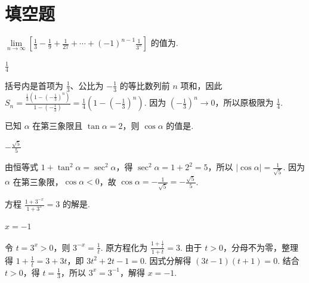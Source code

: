 \section{填空题}

\begin{problem}
\(\displaystyle\lim\limits_{n\to \infty}\left[\frac{1}{3}-\frac{1}{9}+\frac{1}{27}+\cdots+(-1)^{n-1}\frac{1}{3^n}\right]\) 的值为\fillinblank{}.

\begin{answer}
\(\frac{1}{4}\)
\end{answer}

\begin{solution}
括号内是首项为 \(\frac{1}{3}\)、公比为 \(-\frac{1}{3}\) 的等比数列前 \(n\) 项和，因此
\(S_n=\frac{\frac{1}{3}\left(1-\left(-\frac{1}{3}\right)^n\right)}{1-\left(-\frac{1}{3}\right)}=\frac{1}{4}\left(1-\left(-\frac{1}{3}\right)^n\right)\). 因为 \(\left(-\frac{1}{3}\right)^n\to0\)，所以原极限为 \(\frac{1}{4}\).
\end{solution}
\end{problem}

\begin{problem}
已知 \(\alpha\) 在第三象限且 \(\tan \alpha = 2\)，则 \(\cos \alpha\) 的值是\fillinblank{}.

\begin{answer}
\(-\frac{\sqrt{5}}{5}\)
\end{answer}

\begin{solution}
由恒等式 \(1+\tan^2\alpha=\sec^2\alpha\)，得 \(\sec^2\alpha=1+2^2=5\)，所以 \(|\cos\alpha|=\frac{1}{\sqrt{5}}\). 因为 \(\alpha\) 在第三象限，\(\cos\alpha<0\)，故 \(\cos\alpha=-\frac{1}{\sqrt{5}}=-\frac{\sqrt{5}}{5}\).
\end{solution}
\end{problem}

\begin{problem}
方程 \(\frac{1 + 3^{-x}}{1 + 3^x} = 3\) 的解是\fillinblank{}.

\begin{answer}
\(x=-1\)
\end{answer}

\begin{solution}
令 \(t=3^x>0\)，则 \(3^{-x}=\frac{1}{t}\). 原方程化为 \(\frac{1+\frac{1}{t}}{1+t}=3\). 由于 \(t>0\)，分母不为零，整理得 \(1+\frac{1}{t}=3+3t\)，即 \(3t^2+2t-1=0\). 因式分解得 \((3t-1)(t+1)=0\). 结合 \(t>0\)，得 \(t=\frac{1}{3}\)，所以 \(3^x=3^{-1}\)，解得 \(x=-1\).
\end{solution}
\end{problem}

